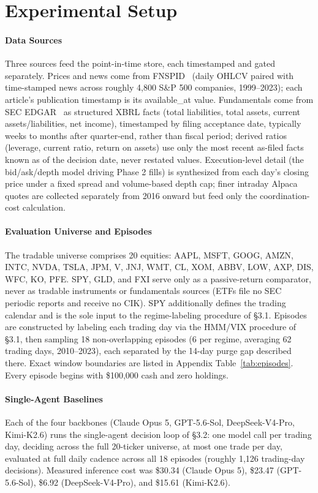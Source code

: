 \documentclass{article}
\begin{document}
\section{Experimental Setup}
\paragraph{Data Sources} Three sources feed the point-in-time store, each timestamped and gated separately. Prices and news come from FNSPID~\cite{dong2024fnspid} (daily OHLCV paired with time-stamped news across roughly 4,800 S\&P 500 companies, 1999--2023); each article's publication timestamp is its available\_at value. Fundamentals come from SEC EDGAR~\cite{secedgar} as structured XBRL facts (total liabilities, total assets, current assets/liabilities, net income), timestamped by filing acceptance date, typically weeks to months after quarter-end, rather than fiscal period; derived ratios (leverage, current ratio, return on assets) use only the most recent as-filed facts known as of the decision date, never restated values. Execution-level detail (the bid/ask/depth model driving Phase 2 fills) is synthesized from each day's closing price under a fixed spread and volume-based depth cap; finer intraday Alpaca quotes are collected separately from 2016 onward but feed only the coordination-cost calculation.
\paragraph{Evaluation Universe and Episodes} The tradable universe comprises 20 equities: AAPL, MSFT, GOOG, AMZN, INTC, NVDA, TSLA, JPM, V, JNJ, WMT, CL, XOM, ABBV, LOW, AXP, DIS, WFC, KO, PFE. SPY, GLD, and FXI serve only as a passive-return comparator, never as tradable instruments or fundamentals sources (ETFs file no SEC periodic reports and receive no CIK). SPY additionally defines the trading calendar and is the sole input to the regime-labeling procedure of \S3.1.
Episodes are constructed by labeling each trading day via the HMM/VIX procedure of \S3.1, then sampling 18 non-overlapping episodes (6 per regime, averaging 62 trading days, 2010--2023), each separated by the 14-day purge gap described there. Exact window boundaries are listed in Appendix Table~\ref{tab:episodes}. Every episode begins with \$100,000 cash and zero holdings.
\paragraph{Single-Agent Baselines} Each of the four backbones (Claude Opus 5, GPT-5.6-Sol, DeepSeek-V4-Pro, Kimi-K2.6) runs the single-agent decision loop of \S3.2: one model call per trading day, deciding across the full 20-ticker universe, at most one trade per day, evaluated at full daily cadence across all 18 episodes (roughly 1,126 trading-day decisions). Measured inference cost was \$30.34 (Claude Opus 5), \$23.47 (GPT-5.6-Sol), \$6.92 (DeepSeek-V4-Pro), and \$15.61 (Kimi-K2.6).
\end{document}
